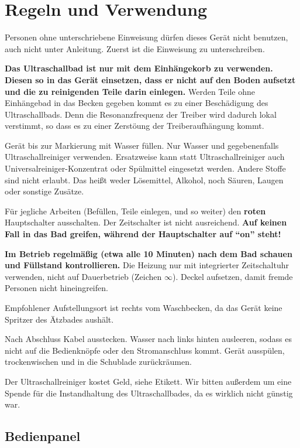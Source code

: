 \documentclass{\basedir/fablab-document}
\begin{document}
\section{Regeln und Verwendung}
Personen ohne unterschriebene Einweisung dürfen dieses Gerät nicht benutzen, auch nicht unter Anleitung.
Zuerst ist die Einweisung zu unterschreiben.

\textbf{Das Ultraschallbad ist nur mit dem Einhängekorb zu verwenden.
Diesen so in das Gerät einsetzen, dass er nicht auf den Boden aufsetzt und die zu reinigenden Teile darin einlegen.}
Werden Teile ohne Einhängebad in das Becken gegeben kommt es zu einer Beschädigung des Ultraschallbads. Denn die Resonanzfrequenz der Treiber wird dadurch lokal verstimmt, so dass es zu einer Zerstöung der Treiberaufhängung kommt.

Gerät bis zur Markierung mit Wasser füllen. Nur Wasser und gegebenenfalls Ultraschallreiniger verwenden.
Ersatzweise kann statt Ultraschallreiniger auch Universalreiniger-Konzentrat oder Spülmittel eingesetzt werden.
Andere Stoffe sind nicht erlaubt.
Das heißt weder Lösemittel, Alkohol, noch Säuren, Laugen oder sonstige Zusätze.

Für jegliche Arbeiten (Befüllen, Teile einlegen, und so weiter) den \textbf{roten} Hauptschalter ausschalten.
Der Zeitschalter ist nicht ausreichend.
\textbf{Auf keinen Fall in das Bad greifen, während der Hauptschalter auf \enquote{on} steht!}

\textbf{Im Betrieb regelmäßig (etwa alle 10 Minuten) nach dem Bad schauen und Füllstand kontrollieren.}
Die Heizung nur mit integrierter Zeitschaltuhr verwenden, nicht auf Dauerbetrieb (Zeichen $\infty$).
Deckel aufsetzen, damit fremde Personen nicht hineingreifen.

Empfohlener Aufstellungsort ist rechts vom Waschbecken, da das Gerät keine Spritzer des Ätzbades aushält.

Nach Abschluss Kabel ausstecken.
Wasser nach links hinten ausleeren, sodass es nicht auf die Bedienknöpfe oder den Stromanschluss kommt.
Gerät ausspülen, trockenwischen und in die Schublade zurückräumen.

Der Ultraschallreiniger kostet Geld, siehe Etikett.
Wir bitten außerdem um eine Spende für die Instandhaltung des Ultraschallbades, da es wirklich nicht günstig war.

\subsection{Bedienpanel}
\end{document}
